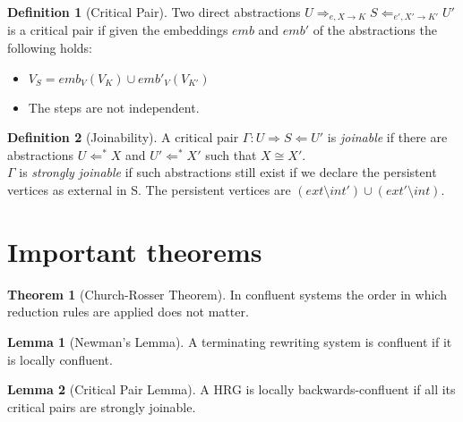 \documentclass[12pt]{article}
\theoremstyle{definition}
\newtheorem{theorem}{Theorem}
\newtheorem{lemma}{Lemma}
\newtheorem{definition}{Definition}
\begin{document}
\begin{definition}[Critical Pair]
Two direct abstractions $U \Rightarrow_{e, X \rightarrow K} S \Leftarrow_{e', X' \rightarrow K'} U'$ is a critical pair if given the embeddings $emb$ and $emb'$ of the abstractions the following holds:
\begin{itemize}
\item $V_S = emb_V(V_K) \cup emb'_V(V_{K'})$
\item The steps are not independent.
\end{itemize}
\end{definition}

\begin{definition}[Joinability]
A critical pair $\Gamma: U \Rightarrow S \Leftarrow U'$ is \emph{joinable} if there are abstractions $U \Leftarrow^* X$ and $U' \Leftarrow^* X'$ such that $X \cong X'$. \\
$\Gamma$ is \emph{strongly joinable} if such abstractions still exist if we declare the persistent vertices as external in S. The persistent vertices are $(ext \setminus int') \cup (ext' \setminus int)$.
\end{definition}

\section{Important theorems}

\begin{theorem}[Church-Rosser Theorem]
In confluent systems the order in which reduction rules are applied does not matter.
\end{theorem}

\begin{lemma}[Newman's Lemma]
A terminating rewriting system is confluent if it is locally confluent.
\end{lemma}

\begin{lemma}[Critical Pair Lemma]
A HRG is locally backwards-confluent if all its critical pairs are strongly joinable.
\end{lemma}
\end{document}
